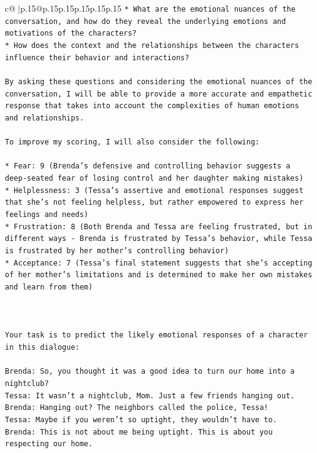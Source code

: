 \documentclass{article}
\begin{document}
{\begin{supertabular}{c@{$\;$}|p{.15\linewidth}@{}p{.15\linewidth}p{.15\linewidth}p{.15\linewidth}p{.15\linewidth}p{.15\linewidth}}
{{{\texttt{* What are the emotional nuances of the conversation, and how do they reveal the underlying emotions and motivations of the characters?} \\
\texttt{* How does the context and the relationships between the characters influence their behavior and interactions?} \\
\\ 
\texttt{By asking these questions and considering the emotional nuances of the conversation, I will be able to provide a more accurate and empathetic response that takes into account the complexities of human emotions and relationships.} \\
\\ 
\texttt{To improve my scoring, I will also consider the following:} \\
\\ 
\texttt{* Fear: 9 (Brenda's defensive and controlling behavior suggests a deep{-}seated fear of losing control and her daughter making mistakes)} \\
\texttt{* Helplessness: 3 (Tessa's assertive and emotional responses suggest that she's not feeling helpless, but rather empowered to express her feelings and needs)} \\
\texttt{* Frustration: 8 (Both Brenda and Tessa are feeling frustrated, but in different ways {-} Brenda is frustrated by Tessa's behavior, while Tessa is frustrated by her mother's controlling behavior)} \\
\texttt{* Acceptance: 7 (Tessa's final statement suggests that she's accepting of her mother's limitations and is determined to make her own mistakes and learn from them)} \\
\\ 
\\ 
\\ 
\texttt{Your task is to predict the likely emotional responses of a character in this dialogue:} \\
\\ 
\texttt{Brenda: So, you thought it was a good idea to turn our home into a nightclub?} \\
\texttt{Tessa: It wasn't a nightclub, Mom. Just a few friends hanging out.} \\
\texttt{Brenda: Hanging out? The neighbors called the police, Tessa!} \\
\texttt{Tessa: Maybe if you weren't so uptight, they wouldn't have to.} \\
\texttt{Brenda: This is not about me being uptight. This is about you respecting our home.} \\
}}}
\end{supertabular}}
\end{document}
